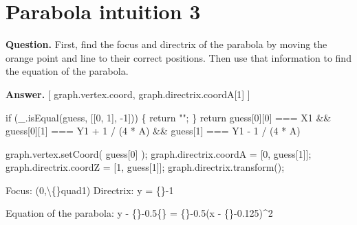 \documentclass{article}
\begin{document}
\section*{Parabola intuition 3}
\textbf{Question.} First, find the focus and directrix of the parabola by moving
                    the orange point and line to their correct positions. Then use that information to find the equation of the parabola.

\textbf{Answer.} [ graph.vertex.coord, graph.directrix.coordA[1] ] 
                        
                            if (\_.isEqual(guess, [[0, 1], -1])) \{
                                return "";
                            \}
                            return guess[0][0] === X1
                                \&\& guess[0][1] === Y1 + 1 / (4 * A)
                                \&\& guess[1] === Y1 - 1 / (4 * A)
                        
                        
                            graph.vertex.setCoord( guess[0] );
                            graph.directrix.coordA = [0, guess[1]];
                            graph.directrix.coordZ = [1, guess[1]];
                            graph.directrix.transform();
                        
                    

                    Focus: (0,\textbackslash\{\}quad1)
                    Directrix: y = \{\}-1
                    
                        Equation of the parabola:
                        y - \{\}-0.5\{\} = \{\}-0.5(x - \{\}-0.125)\textasciicircum{}2
\end{document}
